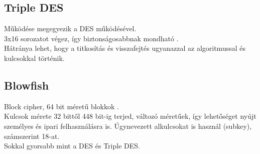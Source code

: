 \subsection{Triple DES}
\noindent Működése megegyezik a DES működésével.
\vspace{5pt}\\3x16 sorozatot végez, így biztonságosabbnak mondható \cite{enwiki:1078804116}.
\vspace{5pt}\\Hátránya lehet, hogy a titkosítás és visszafejtés ugyanazzal az algoritmussal és kulcsokkal történik.



\subsection{Blowfish}
\noindent Block cipher, 64 bit méretű blokkok \cite{nie2009study}.
\vspace{5pt}\\ Kulcsok mérete 32 bittől 448 bit-ig terjed, változó méretűek, így lehetőséget nyújt személyes és ipari felhasználásra is. Úgynevezett alkulcsokat is használ (subkey), számszerint 18-at.
\vspace{5pt}\\ Sokkal gyorsabb mint a DES és Triple DES.









